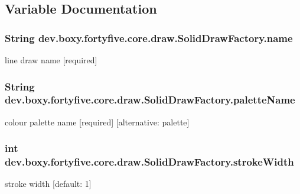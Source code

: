 \subsection{Variable Documentation}
\hypertarget{group___solid_draw_ga2d76fd9b9b039a2df1d3a2fd1e7c2ceb}{
\subsubsection[{name}]{\setlength{\rightskip}{0pt plus 5cm}String {\bf dev.boxy.fortyfive.core.draw.SolidDrawFactory.name}}}
\label{d7/d32/group___solid_draw_ga2d76fd9b9b039a2df1d3a2fd1e7c2ceb}
line draw name \mbox{[}required\mbox{]} \hypertarget{group___solid_draw_ga294947fca0b2ad2e755107ec48d1af5e}{
\subsubsection[{paletteName}]{\setlength{\rightskip}{0pt plus 5cm}String {\bf dev.boxy.fortyfive.core.draw.SolidDrawFactory.paletteName}}}
\label{d7/d32/group___solid_draw_ga294947fca0b2ad2e755107ec48d1af5e}
colour palette name \mbox{[}required\mbox{]} \mbox{[}alternative: palette\mbox{]} \hypertarget{group___solid_draw_ga6a9bdc83f9a995edf6d728c0834f0aea}{
\subsubsection[{strokeWidth}]{\setlength{\rightskip}{0pt plus 5cm}int {\bf dev.boxy.fortyfive.core.draw.SolidDrawFactory.strokeWidth}}}
\label{d7/d32/group___solid_draw_ga6a9bdc83f9a995edf6d728c0834f0aea}
stroke width \mbox{[}default: 1\mbox{]} 